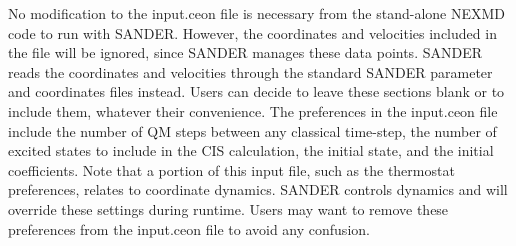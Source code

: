 No modification to the input.ceon file is necessary from the stand-alone NEXMD code to run with SANDER. However, the coordinates
and velocities included in the file will be ignored, since SANDER
manages these data points. SANDER reads the coordinates and velocities
through the standard SANDER parameter and coordinates files
instead. Users can decide to leave these sections blank or to include
them, whatever their convenience. The preferences in the input.ceon file include the number
of QM steps between any classical time-step, the number of excited
states to include in the CIS calculation, the initial state, and the
initial coefficients. Note that a portion of this input file, such as
the thermostat preferences, relates to coordinate dynamics. SANDER
controls dynamics and will override these settings during
runtime. Users may want to remove these preferences from the
input.ceon file to avoid any confusion.

